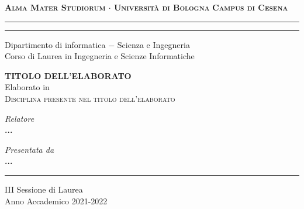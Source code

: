 \begin{titlepage}
    \begin{center}
        {\Large
            \textbf{
                \textsc{Alma Mater Studiorum $\cdot$ Università di Bologna}
            }
        }
        {\large
            \textbf{
                \textsc{Campus di Cesena}
            }
        }
        \rule[0.1cm]{16cm}{0.1mm}
        \rule[0.5cm]{16cm}{0.6mm}
        {\Large
                Dipartimento di informatica $-$ Scienza e Ingegneria \\
        }
        \vspace*{4mm}
        {\Large 
            Corso di Laurea in Ingegneria e Scienze Informatiche
        }
        \vspace*{40mm} %
        \begin{center}
            {\LARGE
                \textbf{
                    TITOLO DELL'ELABORATO \\
                }
            }
            \vspace*{20mm} %
            {\Large
                Elaborato in
            } \\
            \vspace*{3mm}
            {\Large
                \textsc{Disciplina presente nel titolo dell'elaborato}
            }
        \end{center}
        \vspace*{45mm}
        \begin{minipage}[t]{0.47\textwidth}
            {\large
                \textit{Relatore} \\
                \textbf{
                    ...
                }
            }
        \end{minipage}
        \begin{minipage}[t]{0.47\textwidth}\raggedleft
            {\large
                \textit{Presentata da} \\
                \textbf{...}
            }
        \end{minipage}
    \end{center}
    \begin{center}
        \vspace*{30mm}
        \rule[0.1cm]{16cm}{0.1mm}  
    \end{center}
    \begin{center}
        {\large
            III Sessione di Laurea
        } \\
        \vspace*{2mm}
        {\large
            Anno Accademico 2021-2022
        }
    \end{center}
\end{titlepage}
\restoregeometry